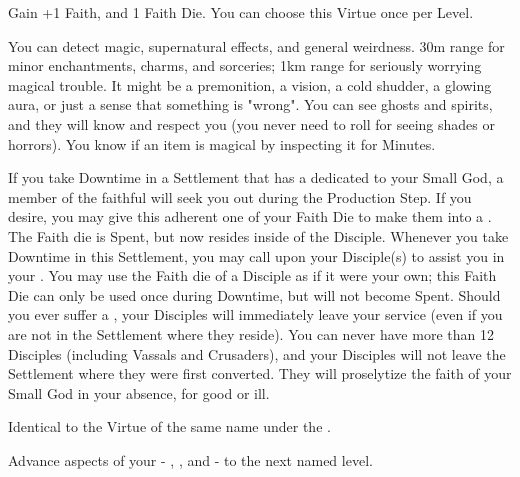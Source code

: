 \begin{multicols*}{2}


Gain +1 \MAX Faith, and 1 Faith Die. You can choose this Virtue once per Level.



You can detect magic, supernatural effects, and general weirdness. 30m range for minor enchantments, charms, and sorceries; 1km range for seriously worrying magical trouble. It might be a premonition, a vision, a cold shudder, a glowing aura, or just a sense that something is "wrong". You can see ghosts and spirits, and they will know and respect you (you never need to roll \INSANITY for seeing shades or horrors). You know if an item is magical by inspecting it for Minutes.


If you take Downtime in a Settlement that has a  dedicated to your Small God, a member of the faithful will seek you out during the Production Step.  If you desire, you may give this adherent one of your Faith Die to make them into a . The Faith die is Spent, but now resides inside of the Disciple.  Whenever you take Downtime in this Settlement, you may call upon your Disciple(s) to assist you in your . You may use the Faith die of a Disciple as if it were your own; this Faith Die can only be used once during Downtime, but will not become Spent. Should you ever suffer a , your Disciples will immediately leave your service (even if you are not in the Settlement where they reside). You can never have more than 12 Disciples (including Vassals and Crusaders), and your Disciples will not leave the Settlement where they were first converted. They will proselytize the faith of your Small God in your absence, for good or ill.


Identical to the Virtue of the same name under the .


Advance  aspects of your  - \DEATH, \INJURY, and \INSANITY - to the next named level.



\end{multicols*}
